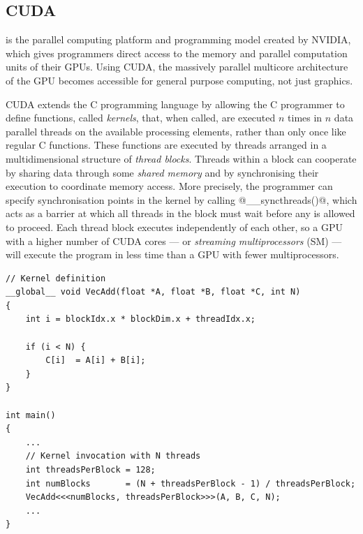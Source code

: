 \subsection{CUDA}
\label{sec:cuda}

\CUDA is the parallel computing platform and programming model created by
NVIDIA, which gives programmers direct access to the memory and parallel
computation units of their GPUs. Using CUDA, the massively parallel multicore
architecture of the GPU becomes accessible for general purpose computing, not
just graphics.

CUDA extends the C programming language by allowing the C programmer to define
functions, called \emph{kernels}, that, when called, are
executed $n$ times in $n$ data parallel threads on the available processing
elements, rather than only once like regular C functions. These functions are
executed by threads arranged in a multidimensional structure of \emph{thread
blocks}. Threads within a block can cooperate by sharing
data through some \emph{shared memory} and by
synchronising their execution to coordinate memory access. More precisely, the
programmer can specify synchronisation points in the kernel by calling
@__syncthreads()@, which acts as a barrier at
which all threads in the block must wait before any is allowed to proceed. Each
thread block executes independently of each other, so a GPU with a higher number
of CUDA cores --- or \emph{streaming multiprocessors} (SM) --- will execute the program in less time than a GPU with
fewer multiprocessors.

\begin{lstlisting}[style=cuda
    ,float
    ,label=lst:cuda_vecadd
    ,caption={[CUDA kernel for pair wise addition of two vectors]A CUDA kernel
        that illustrates pair wise addition of two vectors. The
        \code{__global__} keyword marks a function as a kernel that should be
        executed on the GPU in data parallel. The execution configuration syntax
        \code{<<<...>>>} specifies the number of threads that will each execute
        the function in data parallel.}]
// Kernel definition
__global__ void VecAdd(float *A, float *B, float *C, int N)
{
    int i = blockIdx.x * blockDim.x + threadIdx.x;

    if (i < N) {
        C[i]  = A[i] + B[i];
    }
}

int main()
{
    ...
    // Kernel invocation with N threads
    int threadsPerBlock = 128;
    int numBlocks       = (N + threadsPerBlock - 1) / threadsPerBlock;
    VecAdd<<<numBlocks, threadsPerBlock>>>(A, B, C, N);
    ...
}
\end{lstlisting}

